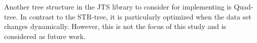 \documentclass[a4paper,12pt]{article}
\begin{document}
Another tree structure in the JTS library 
to consider for implementing is Quad-tree.  
In contrast to the STR-tree, it is particularly optimized when the data set changes dynamically.
However, this is not the focus of this study and is considered as future work.
\newpage
\end{document}
